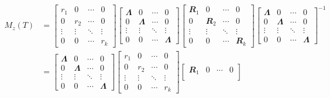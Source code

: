 \documentclass[math]{amznotes}
\theoremstyle{remark}
\begin{document}
\begin{align*}
    M_z(T) & = \begin{bmatrix}
        r_1 & 0 & \cdots & 0 \\
        0 & r_2 & \cdots & 0 \\
        \vdots & \vdots & \ddots & \vdots \\
        0 & 0 & \cdots & r_k
    \end{bmatrix}\begin{bmatrix}
        \mathbfit{\Lambda} & 0 & \cdots & 0 \\
        0 & \mathbfit{\Lambda} & \cdots & 0 \\
        \vdots & \vdots & \ddots & \vdots \\
        0 & 0 & \cdots & \mathbfit{\Lambda}
    \end{bmatrix}\begin{bmatrix}
        \mathbfit{R}_1 & 0 & \cdots & 0 \\
        0 & \mathbfit{R}_2 & \cdots & 0 \\
        \vdots & \vdots & \ddots & \vdots \\
        0 & 0 & \cdots & \mathbfit{R}_k
    \end{bmatrix}\begin{bmatrix}
        \mathbfit{\Lambda} & 0 & \cdots & 0 \\
        0 & \mathbfit{\Lambda} & \cdots & 0 \\  
        \vdots & \vdots & \ddots & \vdots \\
        0 & 0 & \cdots & \mathbfit{\Lambda}
    \end{bmatrix}^{-1} \\
    & = \begin{bmatrix}
        \mathbfit{\Lambda} & 0 & \cdots & 0 \\
        0 & \mathbfit{\Lambda} & \cdots & 0 \\
        \vdots & \vdots & \ddots & \vdots \\
        0 & 0 & \cdots & \mathbfit{\Lambda}
    \end{bmatrix}\begin{bmatrix}
        r_1 & 0 & \cdots & 0 \\
        0 & r_2 & \cdots & 0 \\
        \vdots & \vdots & \ddots & \vdots \\
        0 & 0 & \cdots & r_k
    \end{bmatrix}\begin{bmatrix}
        \mathbfit{R}_1 & 0 & \cdots & 0 \\

\end{bmatrix}
\end{align*}
\end{document}
